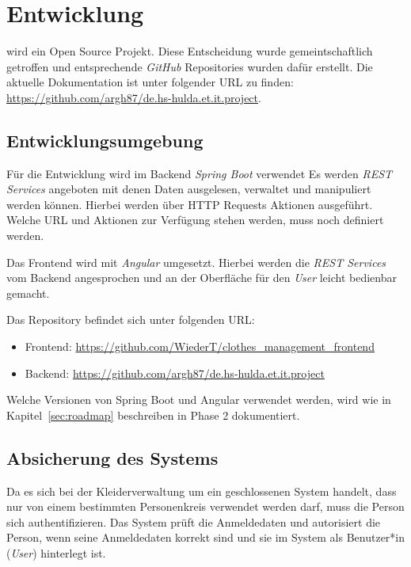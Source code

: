 \section{Entwicklung}\label{sec:Entwicklung}

\project wird ein Open Source Projekt. Diese Entscheidung wurde gemeintschaftlich getroffen und entsprechende \textit{GitHub} Repositories wurden dafür erstellt. Die aktuelle Dokumentation ist unter folgender URL zu finden: \url{https://github.com/argh87/de.hs-hulda.et.it.project}.

\subsection{Entwicklungsumgebung}\label{sec:Umgebung}

Für die Entwicklung wird im Backend \textit{Spring Boot} verwendet Es werden \textit{REST Services} angeboten mit denen Daten ausgelesen, verwaltet und manipuliert werden können. Hierbei werden über HTTP Requests Aktionen ausgeführt. Welche URL und Aktionen zur Verfügung stehen werden, muss noch definiert werden.

Das Frontend wird mit \textit{Angular} umgesetzt. Hierbei werden die \textit{REST Services} vom Backend angesprochen und an der Oberfläche für den \textit{User} leicht bedienbar gemacht.

Das Repository befindet sich unter folgenden URL:

\begin{itemize}
\item Frontend: \url{https://github.com/WiederT/clothes_management_frontend}
\item Backend: \url{https://github.com/argh87/de.hs-hulda.et.it.project}
\end{itemize}

Welche Versionen von Spring Boot und Angular verwendet werden, wird wie in Kapitel~\ref{sec:roadmap} beschreiben in Phase 2 dokumentiert.

\subsection{Absicherung des Systems}\label{sec:Security}

Da es sich bei der Kleiderverwaltung um ein geschlossenen System handelt, dass nur von einem bestimmten Personenkreis verwendet werden darf, muss die Person sich authentifizieren. Das System prüft die Anmeldedaten und autorisiert die Person, wenn seine Anmeldedaten korrekt sind und sie im System als Benutzer*in (\textit{User}) hinterlegt ist.

